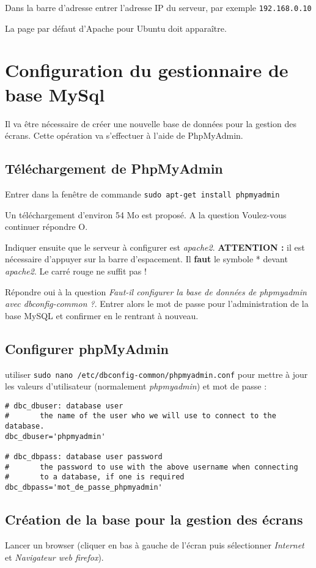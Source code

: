 \documentclass[a4paper]{ffco-rapport}
\begin{document}
		Dans la barre d'adresse entrer l'adresse IP du serveur, par exemple \texttt{192.168.0.10}
		
		La page par défaut d'Apache pour Ubuntu doit apparaître.

\section{Configuration du gestionnaire de base MySql}
	Il va être nécessaire de créer une nouvelle base de données pour la gestion des écrans. Cette opération va s'effectuer à l'aide de PhpMyAdmin.
	

	\subsection{Téléchargement de PhpMyAdmin}
		Entrer dans la fenêtre de commande \verb|sudo apt-get install phpmyadmin|
		
		Un téléchargement d'environ 54 Mo est proposé. A la question \og{}Voulez-vous continuer\fg{} répondre O.
		
		Indiquer ensuite que le serveur à configurer est \emph{apache2}.		
		{\bfseries ATTENTION : } il est nécessaire d'appuyer sur la barre d'espacement.
		Il {\bfseries faut} le symbole \og{}*\fg{} devant \emph{apache2}.
		Le carré rouge ne suffit pas !
		
		Répondre oui à la question \og{}\emph{Faut-il configurer la base de données de phpmyadmin avec dbconfig-common ?}\fg{}. Entrer alors le mot de passe pour l'administration de la base MySQL et confirmer en le rentrant à nouveau.

	\subsection{Configurer phpMyAdmin}
			utiliser \verb|sudo nano /etc/dbconfig-common/phpmyadmin.conf| pour mettre à jour les valeurs d'utilisateur (normalement \emph{phpmyadmin}) et mot de passe :


			\begin{verbatim}
# dbc_dbuser: database user
#       the name of the user who we will use to connect to the database.
dbc_dbuser='phpmyadmin'

# dbc_dbpass: database user password
#       the password to use with the above username when connecting
#       to a database, if one is required
dbc_dbpass='mot_de_passe_phpmyadmin'
			\end{verbatim}
	
		\subsection{Création de la base pour la gestion des écrans}
		Lancer un browser (cliquer en bas à gauche de l'écran puis sélectionner \emph{Internet} et \emph{Navigateur web firefox}).
		
\end{document}
